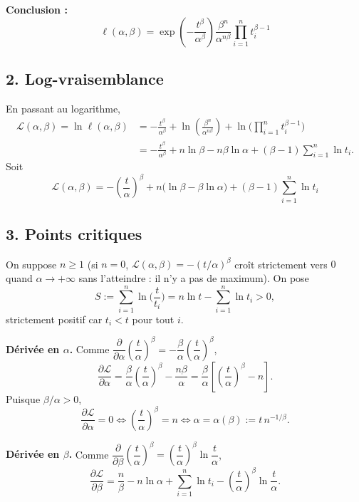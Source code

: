 \medskip
\noindent\textbf{Conclusion :}
\[
  \boxed{\;
  \ell(\alpha,\beta)
  = \exp\!\left(-\frac{t^{\beta}}{\alpha^{\beta}}\right)
    \frac{\beta^{n}}{\alpha^{n\beta}}
    \prod_{i=1}^n t_i^{\beta-1}\;}
\]

\subsection*{2. Log-vraisemblance}

En passant au logarithme,
\begin{align*}
  \mathcal{L}(\alpha,\beta)=\ln \ell(\alpha,\beta)
  &= -\frac{t^{\beta}}{\alpha^{\beta}}
     + \ln\!\left(\frac{\beta^{n}}{\alpha^{n\beta}}\right)
     + \ln\!\Big(\prod_{i=1}^n t_i^{\beta-1}\Big)\\
  &= -\frac{t^{\beta}}{\alpha^{\beta}}
     + n\ln\beta - n\beta\ln\alpha
     + (\beta-1)\sum_{i=1}^n \ln t_i .
\end{align*}
Soit
\[
  \boxed{\;
  \mathcal{L}(\alpha,\beta)
  = -\left(\frac{t}{\alpha}\right)^{\beta}
    + n\big(\ln\beta-\beta\ln\alpha\big)
    + (\beta-1)\sum_{i=1}^n \ln t_i\;}
\]

\subsection*{3. Points critiques}

On suppose $n\geq 1$ (si $n=0$, $\mathcal{L}(\alpha,\beta)=-(t/\alpha)^\beta$ croît strictement
vers $0$ quand $\alpha\to+\infty$ sans l'atteindre : il n'y a pas de maximum).
On pose
\[
  S := \sum_{i=1}^n \ln\!\Big(\frac{t}{t_i}\Big) = n\ln t-\sum_{i=1}^n\ln t_i >0,
\]
strictement positif car $t_i<t$ pour tout $i$.

\medskip
\noindent\textbf{Dérivée en $\alpha$.}
Comme $\dfrac{\partial}{\partial\alpha}\left(\dfrac{t}{\alpha}\right)^{\beta}
 = -\dfrac{\beta}{\alpha}\left(\dfrac{t}{\alpha}\right)^{\beta}$,
\[
  \frac{\partial \mathcal{L}}{\partial\alpha}
  = \frac{\beta}{\alpha}\left(\frac{t}{\alpha}\right)^{\beta}-\frac{n\beta}{\alpha}
  = \frac{\beta}{\alpha}\left[\left(\frac{t}{\alpha}\right)^{\beta}-n\right].
\]
Puisque $\beta/\alpha>0$,
\[
  \frac{\partial \mathcal{L}}{\partial\alpha}=0
  \iff \left(\frac{t}{\alpha}\right)^{\beta}=n
  \iff \alpha=\alpha(\beta):=t\,n^{-1/\beta}.
\]

\medskip
\noindent\textbf{Dérivée en $\beta$.}
Comme $\dfrac{\partial}{\partial\beta}\left(\dfrac{t}{\alpha}\right)^{\beta}
 = \left(\dfrac{t}{\alpha}\right)^{\beta}\ln\dfrac{t}{\alpha}$,
\[
  \frac{\partial \mathcal{L}}{\partial\beta}
  = \frac{n}{\beta}-n\ln\alpha+\sum_{i=1}^n\ln t_i
    -\left(\frac{t}{\alpha}\right)^{\beta}\ln\frac{t}{\alpha}.
\]

